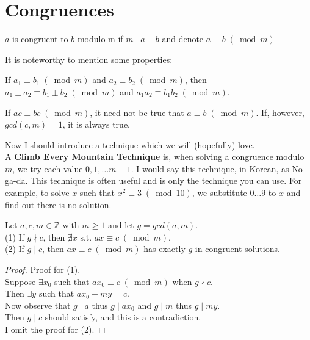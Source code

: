 \section{Congruences}

\begin{definition}
  $a$ is congruent to $b$ modulo m if $m\mid a - b$ and denote $a\equiv b\; (\bmod{m})$
\end{definition}

\noindent
It is noteworthy to mention some properties:

\begin{observation}
  If $a_{1}\equiv b_{1}\; (\bmod{m})$ and $a_{2}\equiv b_{2}\; (\bmod{m})$, then $a_{1} \pm a_{2}\equiv b_{1}\pm b_{2}\; (\bmod{m})$ and $a_{1}a_{2}\equiv b_{1}b_{2}\; (\bmod{m})$.
\end{observation}

\begin{observation}
  If $ac\equiv bc\; (\bmod{m})$, it need not be true that $a\equiv b\; (\bmod{m})$. If, however, $gcd(c, m) = 1$, it is always true. 
\end{observation}

\noindent
Now I should introduce a technique which we will (hopefully) love. \\
A \textbf{Climb Every Mountain Technique} is, when solving a congruence modulo $m$, we try each value $0, 1, \dots m - 1$. I would say this technique, in Korean, as No-ga-da. This technique is often useful and is only the technique you can use. For example, to solve $x$ such that $x^{2}\equiv 3\; (\bmod{10})$, we substitute $0\dots 9$ to $x$ and find out there is no solution.

\begin{theorem}
  Let $a, c, m\in \mathbb{Z}$ with $m\geq 1$ and let $g = gcd(a, m)$. \\
  (1) If $g\nmid c$, then $\nexists{x}$ s.t. $ax\equiv c\; (\bmod{m})$. \\
  (2) If $g\mid c$, then $ax\equiv c\; (\bmod{m})$ has exactly $g$ in congruent solutions.
\end{theorem}

\begin{proof}
Proof for (1). \\
Suppose $\exists{x_{0}}$ such that $ax_{0}\equiv c\; (\bmod{m})$ when $g\nmid c$. \\
Then $\exists{y}$ such that $ax_{0} + my = c$. \\
Now observe that $g\mid a$ thus $g\mid ax_{0}$ and $g\mid m$ thus $g\mid my$. \\
Then $g\mid c$ should satisfy, and this is a contradiction. \\
I omit the proof for (2).
\end{proof}

